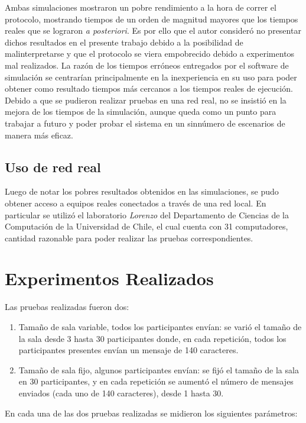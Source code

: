 Ambas simulaciones mostraron un pobre rendimiento a la hora de 
correr el protocolo, mostrando tiempos de un orden de magnitud 
mayores que los tiempos reales que se lograron \emph{a posteriori}. 
Es por ello que el autor consideró no presentar dichos resultados 
en el presente trabajo debido a la posibilidad de malinterpretarse y 
que el protocolo se viera empobrecido debido a experimentos 
mal realizados. La razón de los tiempos erróneos entregados por 
el software de simulación se centrarían principalmente en la 
inexperiencia en su uso para poder obtener como resultado tiempos 
más cercanos a los tiempos reales de ejecución. Debido a que se pudieron 
realizar pruebas en una red real, no se insistió en la mejora de los 
tiempos de la simulación, aunque queda como un punto para trabajar a 
futuro y poder probar el sistema en un sinnúmero de escenarios de 
manera más eficaz.

\subsection{Uso de red real}

Luego de notar los pobres resultados obtenidos en las simulaciones, se 
pudo obtener acceso a equipos reales conectados a través de una red 
local. En particular se utilizó el laboratorio \emph{Lorenzo} del 
Departamento de Ciencias de la Computación de la Universidad de Chile, el 
cual cuenta con 31 computadores, cantidad razonable para poder realizar 
las pruebas correspondientes.

\section{Experimentos Realizados}

Las pruebas realizadas fueron dos:

\begin{enumerate}
	\item Tamaño de sala variable, todos los participantes envían: se 
	varió el tamaño de la sala desde 3 hasta 30 participantes donde, en 
	cada repetición, todos los participantes presentes envían un 
	mensaje de 140 caracteres.
	\item Tamaño de sala fijo, algunos participantes envían: se fijó 
	el tamaño de la sala en 30 participantes, y en cada repetición se 
	aumentó el número de mensajes enviados (cada uno de 140 caracteres), 
	desde 1 hasta 30.
\end{enumerate}

En cada una de las dos pruebas realizadas se midieron los siguientes 
parámetros:

